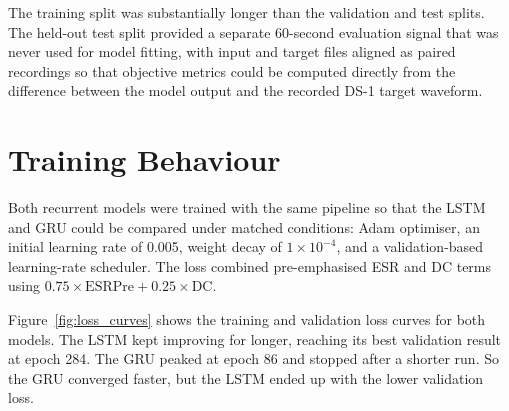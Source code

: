 \begin{table}[htbp]
  \centering
  \caption{Dataset summary}
  \label{tab:dataset-summary}
\end{table}

The training split was substantially longer than the validation and test splits. The held-out test split provided a separate 60-second evaluation signal that was never used for model fitting, with input and target files aligned as paired recordings so that objective metrics could be computed directly from the difference between the model output and the recorded DS-1 target waveform.

\section{Training Behaviour}
\label{sec:training-behaviour}

Both recurrent models were trained with the same pipeline so that the LSTM and GRU could be compared under matched conditions: Adam optimiser, an initial learning rate of 0.005, weight decay of \(1 \times 10^{-4}\), and a validation-based learning-rate scheduler. The loss combined pre-emphasised ESR and DC terms using \(0.75 \times \mathrm{ESRPre} + 0.25 \times \mathrm{DC}\).

Figure~\ref{fig:loss_curves} shows the training and validation loss curves for both models. The LSTM kept improving for longer, reaching its best validation result at epoch 284. The GRU peaked at epoch 86 and stopped after a shorter run. So the GRU converged faster, but the LSTM ended up with the lower validation loss.

